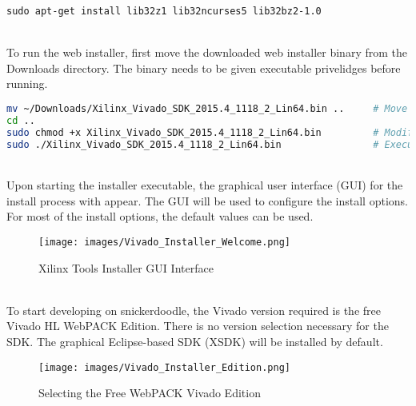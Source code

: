 \begin{lstlisting}
sudo apt-get install lib32z1 lib32ncurses5 lib32bz2-1.0
\end{lstlisting}


~\\
\noindent
To run the web installer, first move the downloaded web installer binary from the Downloads directory. The binary needs to be given executable privelidges before running. \\

\begin{fullwidth}
\begin{lstlisting}[language=bash]
mv ~/Downloads/Xilinx_Vivado_SDK_2015.4_1118_2_Lin64.bin ..     # Move installer to home directory
cd ..                                                           
sudo chmod +x Xilinx_Vivado_SDK_2015.4_1118_2_Lin64.bin         # Modify binary permissions
sudo ./Xilinx_Vivado_SDK_2015.4_1118_2_Lin64.bin                # Execute binary
\end{lstlisting}
\end{fullwidth}


~\\
\noindent
Upon starting the installer executable, the graphical user interface (GUI) for the install process with appear. The GUI will be used to configure the install options. For most of the install options, the default values can be used. \\

\begin{figure}
	\centering
	\texttt{[image: images/Vivado\_Installer\_Welcome.png]}
	\caption{Xilinx Tools Installer GUI Interface}
\end{figure}


~\\
\noindent
To start developing on snickerdoodle, the Vivado version required is the free Vivado HL WebPACK Edition. There is no version selection necessary for the SDK. The graphical Eclipse-based SDK (XSDK) will be installed by default. \\

\begin{figure}
	\centering
	\texttt{[image: images/Vivado\_Installer\_Edition.png]}
	\caption{Selecting the Free WebPACK Vivado Edition}
\end{figure}


